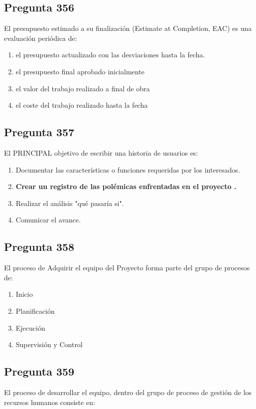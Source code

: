 \documentclass[11pt,a4paper]{article}
\begin{document}
\subsection*{Pregunta 356}
El presupuesto estimado a su finalización (Estimate at Completion, EAC) es una evaluación periódica de:

\begin{enumerate}[label=\alph*)]
  \item el presupuesto actualizado con las desviaciones hasta la fecha.
  \item el presupuesto final aprobado inicialmente
  \item el valor del trabajo realizado a final de obra
  \item el coste del trabajo realizado hasta la fecha
\end{enumerate}

\subsection*{Pregunta 357}
El PRINCIPAL objetivo de escribir una historia de usuarios es:

\begin{enumerate}[label=\alph*)]
  \item Documentar las características o funciones requeridas por los interesados.
  \item \textbf{Crear un registro de las polémicas enfrentadas en el proyecto .}
  \item Realizar el análisis "qué pasaría si".
  \item Comunicar el avance.
\end{enumerate}

\subsection*{Pregunta 358}
El proceso de Adquirir el equipo del Proyecto forma parte del grupo de procesos de:

\begin{enumerate}[label=\alph*)]
  \item Inicio
  \item Planificación
  \item Ejecución
  \item Supervisión y Control
\end{enumerate}

\subsection*{Pregunta 359}
El proceso de desarrollar el equipo, dentro del grupo de proceso de gestión de los recursos humanos consiste en:
\end{document}
